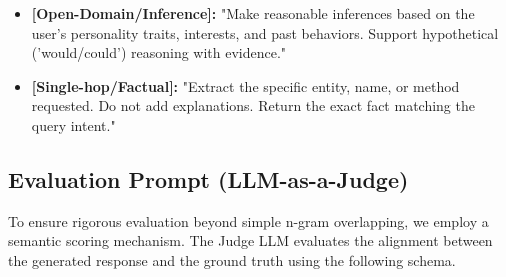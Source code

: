 \documentclass[11pt]{article}
\begin{document}
\begin{tcolorbox}[colback=gray!10, colframe=black, title=\textbf{System Prompt: Adaptive QA}, breakable]
\begin{itemize}[nosep, leftmargin=*]
    \item \textbf{[Open-Domain/Inference]:} "Make reasonable inferences based on the user's personality traits, interests, and past behaviors. Support hypothetical ('would/could') reasoning with evidence."
    
    \item \textbf{[Single-hop/Factual]:} "Extract the specific entity, name, or method requested. Do not add explanations. Return the exact fact matching the query intent."
\end{itemize}
\end{tcolorbox}

\subsection{Evaluation Prompt (LLM-as-a-Judge)}
To ensure rigorous evaluation beyond simple n-gram overlapping, we employ a semantic scoring mechanism. The Judge LLM evaluates the alignment between the generated response and the ground truth using the following schema.
\end{document}
